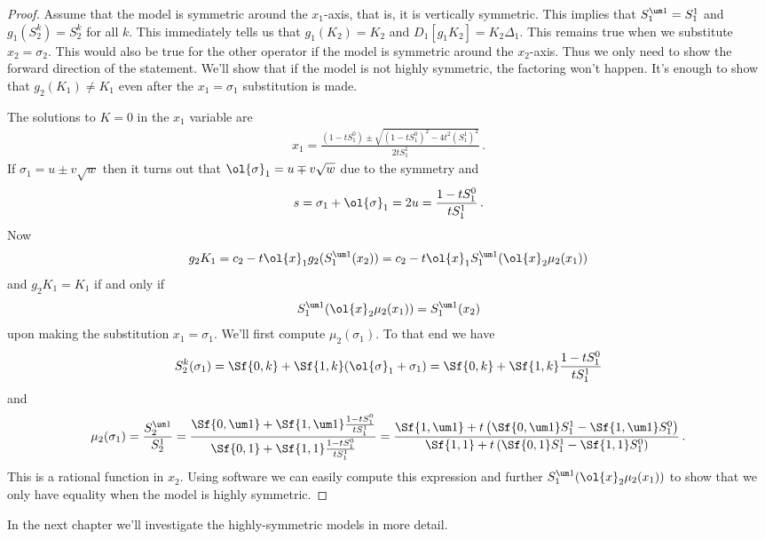 \begin{proof} Assume that the model is symmetric around the $x_1$-axis, that is, it is vertically symmetric. This implies that $S_1^{\um 1} = S_1^1$ and $g_1(S_2^k) = S_2^k$ for all $k$. This immediately tells us that $g_1(K_2) = K_2$ and $D_1[g_1K_2] = K_2 \Delta_1$. This remains true when we substitute $x_2 = \sigma_2$. This would also be true for the other operator if the model is symmetric around the $x_2$-axis. Thus we only need to show the forward direction of the statement. We'll show that if the model is not highly symmetric, the factoring won't happen. It's enough to show that $g_2(K_1) \neq K_1$ even after the $x_1 = \sigma_1$ substitution is made.

The solutions to $K = 0$ in the $x_1$ variable are
\begin{align}
	x_1 = \frac{(1-t S_1^0) \pm \sqrt{(1-tS_1^0)^2 - 4t^2(S_1^1)^2}}{2tS_1^1}\,.
\end{align}
If $\sigma_1 = u \pm v\sqrt{w}$ then it turns out that $\ol{\sigma}_1 = u \mp v\sqrt{w}$ due to the symmetry and
\begin{align}
	s = \sigma_1 + \ol{\sigma}_1 = 2u = \frac{1-tS_1^0}{t S_1^1}\,.
\end{align}
Now
\begin{align}
	g_2 K_1 = c_2 - t \ol{x}_1 g_2(S_1^{\um 1}(x_2)) = c_2 - t\ol{x}_1 S_1^{\um 1}(\ol{x}_2\mu_2(x_1))
\end{align}
and $g_2 K_1 = K_1$ if and only if
\begin{align}
	S_1^{\um 1}(\ol{x}_2\mu_2(x_1)) = S_1^{\um 1}(x_2)
\end{align}
upon making the substitution $x_1 = \sigma_1$. We'll first compute $\mu_2(\sigma_1)$. To that end we have
\begin{align}
	S_2^k(\sigma_1) = \Sf{0,k}+ \Sf{1,k}(\ol{\sigma}_1+ \sigma_1) = \Sf{0,k}+ \Sf{1,k}\frac{1-tS_1^0}{t S_1^1}
\end{align}
and
\begin{align}
	\mu_2(\sigma_1) = \frac{S_2^{\um 1}}{S_2^1} = \frac{ \Sf{0,\um 1}+ \Sf{1,\um 1}\frac{1-tS_1^0}{t S_1^1}}{\Sf{0,1}+ \Sf{1,1}\frac{1-tS_1^0}{t S_1^1}} = \frac{\Sf{1, \um 1}+t\left(\Sf{0,\um 1}S_1^1-\Sf{1,\um 1}S_1^0\right)}{\Sf{1, 1}+t\left(\Sf{0, 1}S_1^1-\Sf{1, 1}S_1^0\right)}\,.
\end{align}
This is a rational function in $x_2$. Using software we can easily compute this expression and further $S_1^{\um 1}(\ol{x}_2\mu_2(x_1))$ to show that we only have equality when the model is highly symmetric.

\end{proof}
In the next chapter we'll investigate the highly-symmetric models in more detail.
